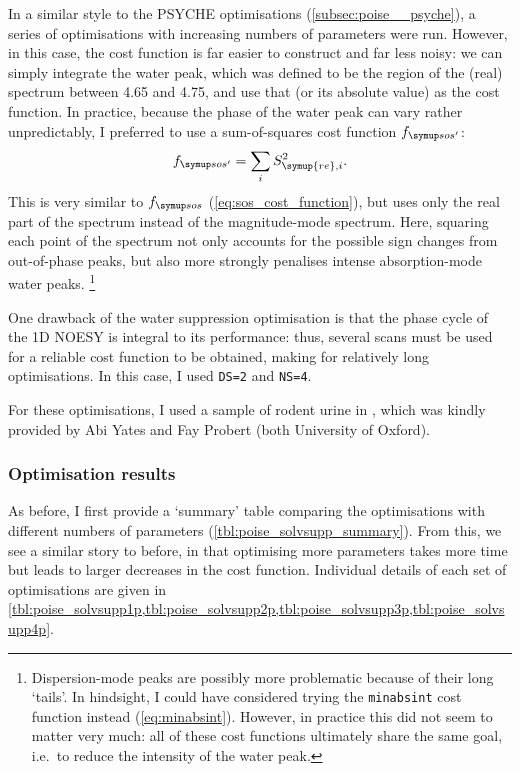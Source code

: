 In a similar style to the PSYCHE optimisations (\cref{subsec:poise__psyche}), a series of optimisations with increasing numbers of parameters were run.
However, in this case, the cost function is far easier to construct and far less noisy: we can simply integrate the water peak, which was defined to be the region of the (real) spectrum between 4.65 and \qty{4.75}{\ppm}, and use that (or its absolute value) as the cost function.
In practice, because the phase of the water peak can vary rather unpredictably, I preferred to use a sum-of-squares cost function $\fsosre$:
\begin{equation}
    \label{eq:sosre_cost_function}
    \fsosre = \sum_i S_{\symup{re},i}^2.
\end{equation}
This is very similar to $\fsos$ (\cref{eq:sos_cost_function}), but uses only the real part of the spectrum instead of the magnitude-mode spectrum.
Here, squaring each point of the spectrum not only accounts for the possible sign changes from out-of-phase peaks, but also more strongly penalises intense absorption-mode water peaks.%
\footnote{Dispersion-mode peaks are possibly more problematic because of their long `tails'. In hindsight, I could have considered trying the \texttt{minabsint} cost function instead (\cref{eq:minabsint}). However, in practice this did not seem to matter very much: all of these cost functions ultimately share the same goal, i.e.\ to reduce the intensity of the water peak.}

One drawback of the water suppression optimisation is that the phase cycle of the 1D NOESY is integral to its performance: thus, several scans must be used for a reliable cost function to be obtained, making for relatively long optimisations.
In this case, I used \texttt{DS=2} and \texttt{NS=4}.

For these optimisations, I used a sample of rodent urine in , which was kindly provided by Abi Yates and Fay Probert (both University of Oxford).



\subsubsection{Optimisation results}

As before, I first provide a `summary' table comparing the optimisations with different numbers of parameters (\cref{tbl:poise_solvsupp_summary}).
From this, we see a similar story to before, in that optimising more parameters takes more time but leads to larger decreases in the cost function.
Individual details of each set of optimisations are given in \cref{tbl:poise_solvsupp1p,tbl:poise_solvsupp2p,tbl:poise_solvsupp3p,tbl:poise_solvsupp4p}.

